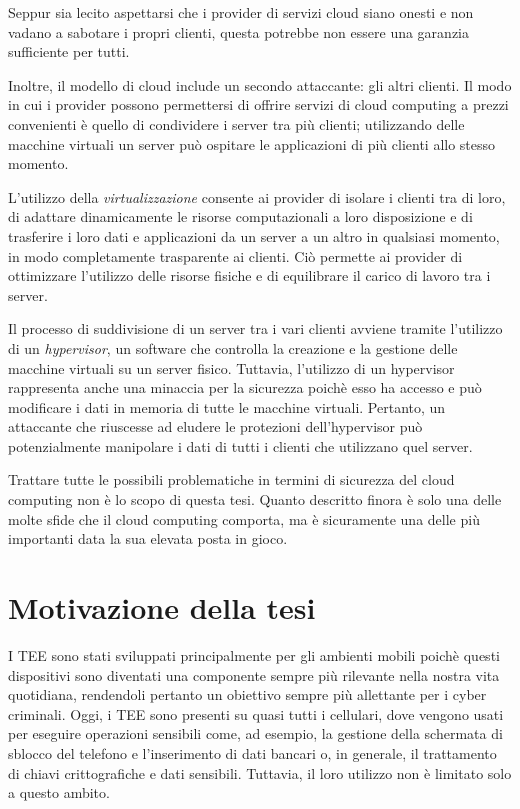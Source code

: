 \documentclass[12pt,italian]{report}
\begin{document}
Seppur sia lecito aspettarsi che i provider di servizi cloud siano onesti
e non vadano a sabotare i propri clienti, questa potrebbe non essere
una garanzia sufficiente per tutti.

Inoltre, il modello di cloud include un secondo attaccante: gli altri
clienti.
Il modo in cui i provider possono permettersi di offrire servizi di cloud
computing a prezzi convenienti è quello di condividere i server tra più
clienti; utilizzando delle macchine virtuali un server
può ospitare le applicazioni di più clienti allo stesso momento.

L'utilizzo della \textit{virtualizzazione} consente ai provider di isolare
i clienti tra di loro, di adattare
dinamicamente le risorse computazionali a loro disposizione e di trasferire
i loro dati e applicazioni da un server a un altro in qualsiasi
momento, in modo completamente trasparente ai clienti.
Ciò permette ai provider di ottimizzare l'utilizzo delle risorse
fisiche e di equilibrare il carico di lavoro tra i server.

Il processo di suddivisione di un server tra i vari clienti avviene tramite
l'utilizzo di un \textit{hypervisor}, un software che controlla la creazione
e la gestione delle macchine virtuali su un server fisico.
Tuttavia, l'utilizzo di un hypervisor rappresenta anche una minaccia per
la sicurezza poichè esso ha accesso e può modificare i dati in memoria
di tutte le macchine virtuali.
Pertanto, un attaccante che riuscesse ad eludere le protezioni
dell'hypervisor può potenzialmente manipolare i dati di tutti i clienti
che utilizzano quel server.

Trattare tutte le possibili problematiche in termini di sicurezza del
cloud computing non è lo scopo di questa tesi.
Quanto descritto finora è solo una delle molte sfide che il cloud computing
comporta, ma è sicuramente una delle più importanti data la sua elevata
posta in gioco.

\section{Motivazione della tesi}
\label{sec:motivazione}
I TEE sono stati sviluppati principalmente per gli ambienti mobili
poichè questi dispositivi sono diventati una componente sempre più
rilevante nella nostra vita quotidiana, rendendoli pertanto un
obiettivo sempre più allettante per i cyber criminali.
Oggi, i TEE sono presenti su quasi tutti i cellulari, dove vengono
usati per eseguire operazioni sensibili come, ad esempio, la gestione
della schermata di sblocco del telefono e l'inserimento di dati bancari
o, in generale, il trattamento di chiavi crittografiche e dati sensibili.
Tuttavia, il loro utilizzo non è limitato solo a questo ambito.
\end{document}
